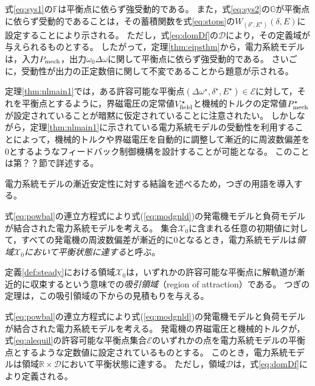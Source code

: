 \documentclass[tombow,dvipdfmx]{corona-a5}
\begin{document}
\begin{証明}
式\ref{eq:sys1}の$\mathds{F}$は平衡点に依らず強受動的である。
また，式\ref{eq:sys2}の$\mathds{G}$が平衡点に依らず受動的であることは，その蓄積関数を式\ref{eq:stops}の$W_{(\delta^{\star},E^{\star})}(\delta,E)$に設定することにより示される。
ただし，式\ref{eq:domDf}の$\mathcal{D}$により，その定義域が与えられるものとする。
したがって，定理\ref{thm:eipsthm}から，電力系統モデルは，入力$P_{\rm mech}$，出力$\omega_0 \Delta \omega$に関して平衡点に依らず強受動的である。
さいごに，受動性が出力の正定数倍に関して不変であることから題意が示される。
\end{証明}

定理\ref{thm:nlmain1}では，ある許容可能な平衡点$(\Delta \omega^{\star},\delta^{\star},E^{\star}) \in \mathcal{E}$に対して，それを平衡点とするように，界磁電圧の定常値$V_{\rm field}^{\star}$と機械的トルクの定常値$P_{\rm mech}^{\star}$が設定されていることが暗黙に仮定されていることに注意されたい。
しかしながら，定理\ref{thm:nlmain1}に示されている電力系統モデルの受動性を利用することによって，機械的トルクや界磁電圧を自動的に調整して漸近的に周波数偏差を0とするようなフィードバック制御機構を設計することが可能となる。
このことは第？？節で詳述する。

電力系統モデルの漸近安定性に対する結論を述べるため，つぎの用語を導入する。

\begin{定義}[電力系統モデルの平衡状態に関する吸引領域]\label{def:steady}
式\ref{eq:powbal}の連立方程式により式(\ref{eq:modgnld})の発電機モデルと負荷モデルが結合された電力系統モデルを考える。
集合$\mathcal{X}_0$に含まれる任意の初期値に対して，すべての発電機の周波数偏差が漸近的に0となるとき，電力系統モデルは\emph{領域$\mathcal{X}_0$において平衡状態に達する}と呼ぶ。
\end{定義}

定義\ref{def:steady}における領域$\mathcal{X}_0$は，いずれかの許容可能な平衡点に解軌道が漸近的に収束するという意味での\emph{吸引領域}（region of attraction）である。
つぎの定理は，この吸引領域の下からの見積もりを与える。


\begin{定理}[吸引領域の下からの見積もり]\label{thm:nlmain2}
式\ref{eq:powbal}の連立方程式により式(\ref{eq:modgnld})の発電機モデルと負荷モデルが結合された電力系統モデルを考える。
発電機の界磁電圧と機械的トルクが，式\ref{eq:alequil}の許容可能な平衡点集合$\mathcal{E}$のいずれかの点を電力系統モデルの平衡点とするような定数値に設定されているものとする。
このとき，電力系統モデルは領域$\mathbb{R}\times \mathcal{D}$において平衡状態に達する。
ただし，領域$\mathcal{D}$は，式\ref{eq:domDf}により定義される。
\end{定理}
\end{document}

